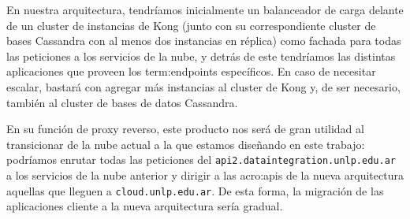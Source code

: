 En nuestra arquitectura, tendríamos inicialmente un balanceador de carga delante de un cluster de instancias de Kong (junto con su correspondiente cluster de bases Cassandra con al menos dos instancias en réplica) como fachada para todas las peticiones a los servicios de la nube, y detrás de este tendríamos las distintas aplicaciones que proveen los \glspl{term:endpoint} específicos. En caso de necesitar escalar, bastará con agregar más instancias al cluster de Kong y, de ser necesario, también al cluster de bases de datos Cassandra.

En su función de proxy reverso, este producto nos será de gran utilidad al transicionar de la nube actual a la que estamos diseñando en este trabajo: podríamos enrutar todas las peticiones del  \texttt{api2.dataintegration.unlp.edu.ar} a los servicios de la nube anterior y dirigir a las \glspl{acro:api} de la nueva arquitectura aquellas que lleguen a \texttt{cloud.unlp.edu.ar}. De esta forma, la migración de las aplicaciones cliente a la nueva arquitectura sería gradual.

